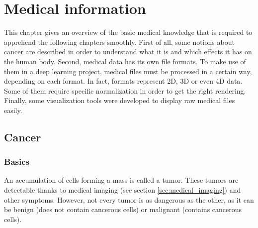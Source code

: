 
\chapter{Medical information}
\label{ch:medical}
\setlength{\marginparwidth}{3cm}\leavevmode {}This chapter gives an overview of the basic medical knowledge that is required to apprehend the following chapters smoothly. First of all, some notions about cancer are described in order to understand what it is and which effects it has on the human body. Second, medical data has its own file formats. To make use of them in a deep learning project, medical files must be processed in a certain way, depending on each format. In fact, formats represent 2D, 3D or even 4D data. Some of them require specific normalization in order to get the right rendering. Finally, some visualization tools were developed to display raw medical files easily. 


\section{Cancer}
\subsection{Basics}
\setlength{\marginparwidth}{3cm}\leavevmode {}An accumulation of cells forming a mass is called a tumor. These tumors are detectable thanks to medical imaging (see section \ref{sec:medical_imaging}) and other symptoms. However, not every tumor is as dangerous as the other, as it can be benign (does not contain cancerous cells) or malignant (contains cancerous cells).

